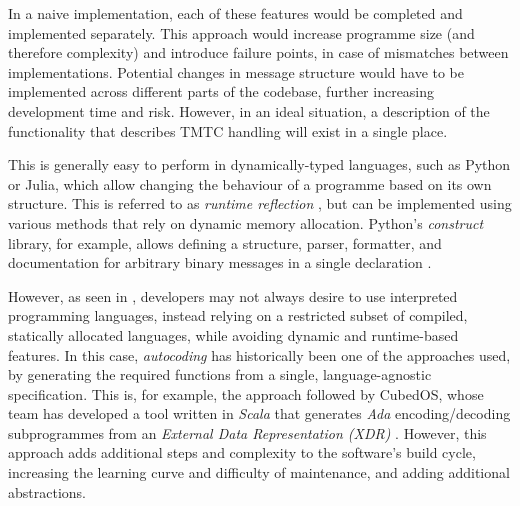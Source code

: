 \documentclass[a4paper,nobib,justified,final]{tufte-book}
\begin{document}
In a naive implementation, each of these features would be completed and implemented separately. This approach would increase programme size (and therefore complexity) and introduce failure points, in case of mismatches between implementations. Potential changes in message structure would have to be implemented across different parts of the codebase, further increasing development time and risk. However, in an ideal situation, a description of the functionality that describes \acs{TMTC} handling will exist in a single place.

This is generally easy to perform in dynamically-typed languages, such as Python or Julia, which allow changing the behaviour of a programme based on its own structure. This is referred to as \emph{runtime reflection} \autocite{smithProceduralReflectionProgramming1982}, but can be implemented using various methods that rely on dynamic memory allocation. Python's \emph{construct} library, for example, allows defining a structure, parser, formatter, and documentation for arbitrary binary messages in a single declaration \autocite{bulskiConstruct2020}.


However, as seen in , developers may not always desire to use interpreted programming languages, instead relying on a restricted subset of compiled, statically allocated languages, while avoiding dynamic and runtime-based features. In this case, \emph{autocoding} has historically been one of the approaches used, by generating the required functions from a single, language-agnostic specification. This is, for example, the approach followed by CubedOS, whose team has developed a tool written in \emph{Scala} that generates \emph{Ada} encoding/decoding subprogrammes from an \emph{External Data Representation (XDR)} \autocite{brandonCubedOSVerifiedCubeSat2017}. However, this approach adds additional steps and complexity to the software's build cycle, increasing the learning curve and difficulty of maintenance, and adding additional abstractions.
\end{document}
